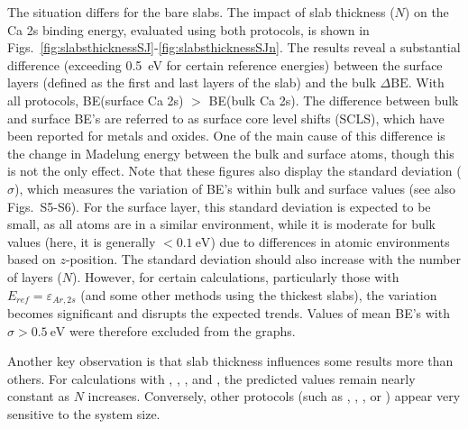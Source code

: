 \documentclass[%
aip,
amsmath,amssymb,
preprint,%
jcp,
showkeys,
]{revtex4-2}
\def\dbe{\ensuremath{\Delta\text{BE}}}
\begin{document}
The situation differs for the bare slabs. The impact of slab thickness ($N$) on the Ca 2s binding energy, evaluated using both protocols, is shown in Figs.~\ref{fig:slabsthicknessSJ}-\ref{fig:slabsthicknessSJn}. The results reveal a substantial difference (exceeding \SI{0.5}{\electronvolt} for certain reference energies) between the surface layers (defined as the first and last layers of the slab) and the bulk \dbe{}. With all protocols, BE(surface Ca 2s) $>$ BE(bulk Ca 2s). The difference between bulk and surface BE's are referred to as surface core level shifts (SCLS),\cite{olovssonCorelevelShiftsComplex2006,bagusChemicalSignificanceXray2023} which have been reported for metals\cite{aldenInitioSurfaceCorelevel1993,weinertCorelevelShiftsBulk1995,olovssonCorelevelShiftsComplex2006} and oxides\cite{harmerSpeciesFormedCuprite2009,lousadaFirstStagesOxide2018,bagusRevisitingSurfaceCorelevel2019}. One of the main cause of this difference is the change in Madelung energy between the bulk and surface atoms\cite{nelinSurfaceCorelevelBinding2014}, though this is not the only effect\cite{bagusRevisitingSurfaceCorelevel2019,bagusChemicalSignificanceXray2023,bagusXrayPhotoelectronSpectroscopy2024}. 
Note that these figures also display the standard deviation ($\sigma$), which measures the variation of BE's within bulk and surface values (see also Figs.~S5-S6). For the surface layer, this standard deviation is expected to be small, as all atoms are in a similar environment, while it is moderate for bulk values (here, it is generally $<\SI{0.1}{\electronvolt}$) due to differences in atomic environments based on $z$-position. The standard deviation should also increase with the number of layers ($N$). However, for certain calculations, particularly those with $E_{ref}=\varepsilon_{Ar,2s}$ (and some other methods using the thickest slabs), the variation becomes significant and disrupts the expected trends. Values of mean BE's with $\sigma > \SI{0.5}{\electronvolt}$ were therefore excluded from the graphs.


Another key observation is that slab thickness influences some results more than others. For calculations with , , , and , the predicted values remain nearly constant as $N$ increases. Conversely, other protocols (such as , , \cpx{\phi}, or ) appear very sensitive to the system size. 
\end{document}
